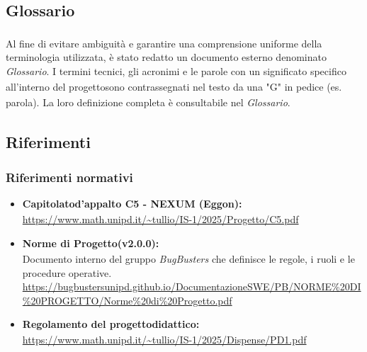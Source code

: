 \documentclass[a4paper,11pt]{article}
\renewcommand{\G}{\texorpdfstring{\textsubscript{\scalebox{0.6}{\textbf{G}}}\xspace}{ G}}
\begin{document}
\subsection{Glossario\G}
Al fine di evitare ambiguità e garantire una comprensione uniforme della terminologia utilizzata, è stato redatto un documento esterno denominato \textit{Glossario\G}.
I termini tecnici, gli acronimi e le parole con un significato specifico all'interno del progetto\G sono contrassegnati nel testo da una "G" in pedice (es. parola). La loro definizione completa è consultabile nel \textit{Glossario\G}.

\subsection{Riferimenti}

\subsubsection{Riferimenti normativi}
\begin{itemize}
    \item \textbf{Capitolato\G d'appalto C5 - NEXUM (Eggon):}\\
    \url{https://www.math.unipd.it/~tullio/IS-1/2025/Progetto/C5.pdf}
    
    \item \textbf{Norme di Progetto\G (v2.0.0):}\\
    Documento interno del gruppo \textit{BugBusters} che definisce le regole, i ruoli e le procedure operative.\\
    \url{https://bugbustersunipd.github.io/DocumentazioneSWE/PB/NORME%20DI%20PROGETTO/Norme%20di%20Progetto.pdf}
    
    \item \textbf{Regolamento del progetto\G didattico:} \\
    \url{https://www.math.unipd.it/~tullio/IS-1/2025/Dispense/PD1.pdf}
\end{itemize}
\end{document}
